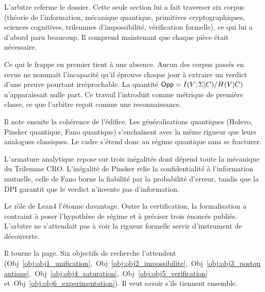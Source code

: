 \begin{boiteArbitre}
L'arbitre referme le dossier. Cette seule section lui a fait traverser six corpus
(th\'eorie de l'information, m\'ecanique quantique, primitives cryptographiques,
sciences cognitives, trilemmes d'impossibilit\'e, v\'erification formelle),
ce qui lui a d'abord paru beaucoup. Il comprend maintenant que chaque pi\`ece \'etait n\'ecessaire.

Ce qui le frappe en premier tient \`a une absence. Aucun des corpus pass\'es en
revue ne nommait l'incapacit\'e qu'il \'eprouve chaque jour \`a extraire
un verdict d'une preuve pourtant irr\'eprochable. La quantit\'e $\mathsf{Opp} = I(V;\Sigma|C)/H(V|C)$
n'apparaissait nulle part. Ce travail l'introduit comme m\'etrique de premi\`ere
classe, ce que l'arbitre re\c{c}oit comme une reconnaissance.

Il note ensuite la coh\'erence de l'\'edifice. Les g\'en\'eralisations quantiques
(Holevo, Pinsker quantique, Fano quantique) s'encha\^inent avec la m\^eme rigueur
que leurs analogues classiques. Le cadre s'\'etend donc au r\'egime quantique
sans se fracturer.

L'armature analytique repose sur trois in\'egalit\'es dont d\'epend toute la
m\'ecanique du Trilemme CRO. L'in\'egalit\'e de Pinsker relie la confidentialit\'e
\`a l'information mutuelle, celle de Fano borne la fiabilit\'e par la probabilit\'e
d'erreur, tandis que la DPI garantit que le verdict n'invente pas d'information.

Le r\^ole de Lean4 l'\'etonne davantage. Outre la certification, la formalisation
a contraint \`a poser l'hypoth\`ese de r\'egime et \`a pr\'eciser trois \'enonc\'es publi\'es. L'arbitre
ne s'attendait pas \`a voir la rigueur formelle servir d'instrument de d\'ecouverte.

Il tourne la page. Six objectifs de recherche l'attendent (Obj~\ref{obj:obj1_unification},~Obj~\ref{obj:obj2_impossibilite},~Obj~\ref{obj:obj3_postquantique},~Obj~\ref{obj:obj4_saturation},~Obj~\ref{obj:obj5_verification} et~Obj~\ref{obj:obj6_experimentation}). Il veut savoir
s'ils tiennent ensemble.
\end{boiteArbitre}